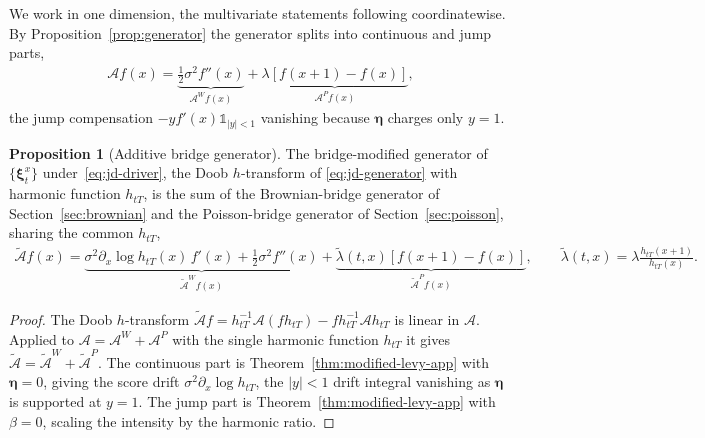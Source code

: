 \documentclass{article}
\def\1{\mathds{1}}
\def\xib{\boldsymbol{\xi}}
\theoremstyle{definition}
\newtheorem{proposition}{Proposition}[section]
\begin{document}
We work in one dimension, the multivariate statements following coordinatewise. By
Proposition~\ref{prop:generator} the generator splits into continuous and jump parts,
\begin{align}
\label{eq:jd-generator}
\mathcal{A}f(x)=\underbrace{\tfrac12\sigma^2 f''(x)}_{\mathcal{A}^W f(x)}
 + \underbrace{\lambda[f(x+1)-f(x)]}_{\mathcal{A}^P f(x)},
\end{align}
the jump compensation $-yf'(x)\1_{|y|<1}$ vanishing because $\boldsymbol{\eta}$ charges only $y=1$.

\begin{proposition}[Additive bridge generator]
\label{prop:jd-generator-split}
The bridge-modified generator of $\{\xib^{x}_t\}$ under~\eqref{eq:jd-driver}, the Doob $h$-transform of
\eqref{eq:jd-generator} with harmonic function $h_{tT}$, is the sum of the Brownian-bridge generator of
Section~\ref{sec:brownian} and the Poisson-bridge generator of Section~\ref{sec:poisson}, sharing the
common $h_{tT}$,
\begin{align}
\label{eq:jd-modified-generator}
\widetilde{\mathcal{A}}f(x)
 = \underbrace{\sigma^2\partial_x\!\log h_{tT}(x)\,f'(x)+\tfrac12\sigma^2 f''(x)}_{\widetilde{\mathcal{A}}^W f(x)}
 + \underbrace{\widetilde{\lambda}(t,x)[f(x+1)-f(x)]}_{\widetilde{\mathcal{A}}^P f(x)},
\qquad \widetilde{\lambda}(t,x)=\lambda\frac{h_{tT}(x+1)}{h_{tT}(x)}.
\end{align}
\end{proposition}
\begin{proof}
The Doob $h$-transform $\widetilde{\mathcal{A}}f=h_{tT}^{-1}\mathcal{A}(fh_{tT})-f h_{tT}^{-1}\mathcal{A}h_{tT}$
is linear in $\mathcal{A}$. Applied to $\mathcal{A}=\mathcal{A}^W+\mathcal{A}^P$ with the single harmonic
function $h_{tT}$ it gives $\widetilde{\mathcal{A}}=\widetilde{\mathcal{A}}^W+\widetilde{\mathcal{A}}^P$.
The continuous part is Theorem~\ref{thm:modified-levy-app} with $\boldsymbol{\eta}=0$, giving the score
drift $\sigma^2\partial_x\log h_{tT}$, the $|y|<1$ drift integral vanishing as $\boldsymbol{\eta}$ is
supported at $y=1$. The jump part is Theorem~\ref{thm:modified-levy-app} with $\beta=0$, scaling the
intensity by the harmonic ratio.
\end{proof}
\end{document}
